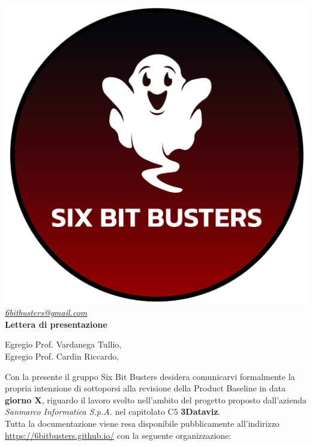 \thispagestyle{empty}
\renewcommand{\arraystretch}{1.0}


\begin{titlepage}
	\begin{center}
	\includegraphics[scale = 0.5]{template/images/logo-circle.png}
	\\[1cm]
	\href{mailto:6bitbusters@gmail.com}		      	
	{\large{\textit{6bitbusters@gmail.com} } }\\[1cm]
	
	{\Huge{ \textbf{Lettera di presentazione} } }\\[1cm]
        \end{center}
        Egregio Prof. Vardanega Tullio, \\
        Egregio Prof. Cardin Riccardo,
        \newline
        
        \noindent Con la presente il gruppo Six Bit Busters desidera comunicarvi formalmente la propria
        intenzione di sottoporsi alla revisione della Product Baseline in data \textbf{giorno X}, riguardo il lavoro svolto nell'ambito del progetto proposto dall'azienda \textit{Sanmarco Informatica S.p.A.}
        nel capitolato C5 \textbf{3Dataviz}.\\

        \noindent Tutta la documentazione viene resa disponibile pubblicamente all'indirizzo \url{https://6bitbusters.github.io/} con la
        seguente organizzazione:


\end{titlepage}
